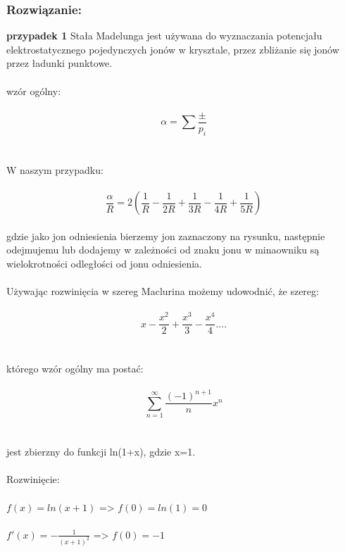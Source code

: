 \subsubsection*{Rozwiązanie:}
\textbf{przypadek 1}
Stała Madelunga jest używana do wyznaczania potencjału elektrostatycznego pojedynczych jonów w krysztale, przez zbliżanie się jonów przez ładunki punktowe. 
\\
\\
wzór ogólny:
\\
\\
\begin{equation}
\alpha=\sum \frac {\pm}{p_i}
\end{equation}
\\
\\
W naszym przypadku: 
\\
\\
\begin{equation}
\frac{\alpha}{R}=2\left( \frac{1}{R}-\frac{1}{2R}+\frac{1}{3R}-\frac{1}{4R}+\frac{1}{5R} \right)
\end{equation}
\\
gdzie jako jon odniesienia bierzemy jon zaznaczony na rysunku, następnie odejmujemu lub dodajemy w zależności od znaku jonu w minaowniku są wielokrotności odległości od jonu odniesienia.
\\
\\
Używając rozwinięcia w szereg Maclurina możemy udowodnić, że szereg:
\\
\\
\begin{equation}
x-\frac{x^2}{2}+\frac{x^3}{3}-\frac{x^4}{4}....
\end{equation}
\\
\\
którego wzór ogólny ma postać:
\\
\\
\begin{equation}
\sum_{n=1}^{\infty}\frac{(-1)^{n+1}}{n}x^n
\end{equation}
\\
\\
jest zbierzny do funkcji ln(1+x), gdzie x=1.
\\
\\
Rozwinięcie:
\\
\\
$f(x)=ln(x+1)$   =>   $f(0)=ln(1)=0$
\\
\\
$f'(x)=-\frac{1}{(x+1)^2}$   =>   $f(0)=-1$
\\

